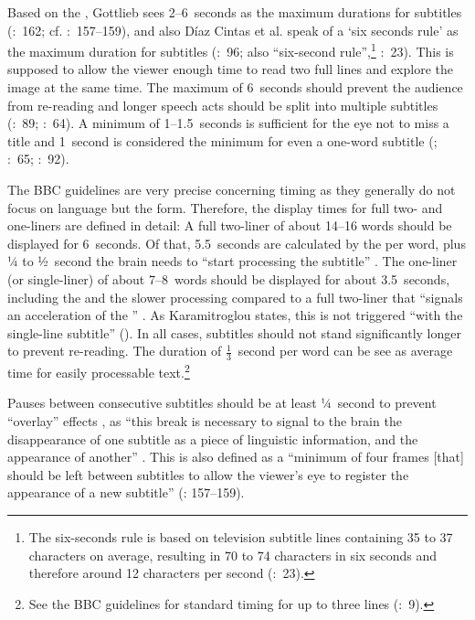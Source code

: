 Based on the , Gottlieb sees 2--6~seconds as the maximum durations for subtitles (\citeyear{Gottlieb2012}:~162; cf. \citealt{Ivarsson1998}:~157--159), and also Díaz Cintas et al. speak of a ‘six seconds rule’ as the maximum duration for subtitles (\citeyear{Diaz_cintas2007b}:~96; also “six-second rule”,\footnote{The six-seconds rule is based on television subtitle lines containing 35 to 37 characters on average, resulting in 70 to 74 characters in six seconds and therefore around 12 characters per second (\citealt{Diaz_cintas2007}:~23).} \citealt{Diaz_cintas2007}:~23). This is supposed to allow the viewer enough time to read two full lines and explore the image at the same time. The maximum of 6~seconds should prevent the audience from re-reading and longer speech acts should be split into multiple subtitles (\citealt{Karamitroglou1998}:~89; \citealt{Ivarsson1998}:~64). A minimum of 1--1.5~seconds is sufficient for the eye not to miss a title and 1~second is considered the minimum for even a one-word subtitle (\citealt{Karamitroglou1998}; \citealt{Ivarsson1998}:~65; \citealt{Diaz_cintas2007b}:~92).

\largerpage[2]
The BBC guidelines are very precise concerning timing as they generally do not focus on language but the form. Therefore, the display times for full two- and one-liners are defined in detail: A full two-liner of about 14--16 words should be displayed for 6~seconds. Of that, 5.5~seconds are calculated by the  per word, plus ¼ to ½~second the brain needs to “start processing the subtitle” \citep{Karamitroglou1998}. The one-liner (or single-liner) of about 7--8~words should be displayed for about 3.5~seconds, including the  and the slower processing compared to a full two-liner that “signals an acceleration of the ” \citep{Karamitroglou1998}. As Karamitroglou states, this is not triggered “with the single-line subtitle” (\citeyear{Karamitroglou1998}). In all cases, subtitles should not stand significantly longer to prevent re-reading. The duration of $\frac13$~second per word can be see as average time for easily processable text.\footnote{See the BBC guidelines for standard timing for up to three lines (\citealt{Ford_williams2009}:~9).}

\newpage 
Pauses between consecutive subtitles should be at least ¼~second to prevent “overlay” effects \citep{Karamitroglou1998}, as “this break is necessary to signal to the brain the disappearance of one subtitle as a piece of linguistic information, and the appearance of another” \citep{Karamitroglou1998}. This is also defined as a “minimum of four frames [that] should be left between subtitles to allow the viewer’s eye to register the appearance of a new subtitle” (\citealt{Ivarsson1998}: 157--159).

